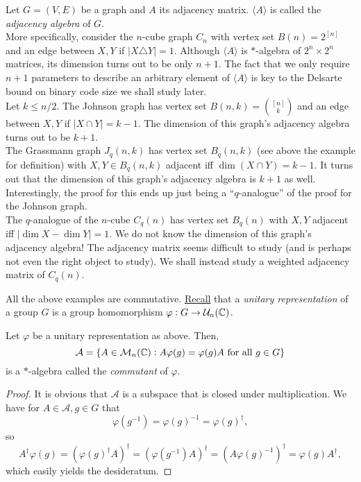 	\begin{fex}
		\label{exmp: star-alg}
		Let $G = (V,E)$ be a graph and $A$ its adjacency matrix. $\langle A\rangle$ is called the \emph{adjacency algebra} of $G$. \\

		More specifically, consider the $n$-cube graph $C_n$ with vertex set $B(n)=2^{[n]}$ and an edge between $X,Y$ if $|X \triangle Y| = 1$. Although $\langle A\rangle$ is $*$-algebra of $2^n \times 2^n$ matrices, its dimension turns out to be only $n+1$. The fact that we only require $n+1$ parameters to describe an arbitrary element of $\langle A\rangle$ is key to the Delsarte bound on binary code size we shall study later.\\

		Let $k \le n/2$. The Johnson graph has vertex set $B(n,k) = \binom{[n]}{k}$ and an edge between $X,Y$ if $|X \cap Y| = k-1$. The dimension of this graph's adjacency algebra turns out to be $k+1$.\\

		The Grassmann graph $J_q(n,k)$ has vertex set $B_q(n,k)$ (see above the example for definition) with $X,Y \in B_q(n,k)$ adjacent iff $\dim(X \cap Y) = k-1$. It turns out that the dimension of this graph's adjacency algebra is $k+1$ as well. Interestingly, the proof for this ends up just being a ``$q$-analogue'' of the proof for the Johnson graph.\\

		The $q$-analogue of the $n$-cube $C_q(n)$ has vertex set $B_q(n)$ with $X,Y$ adjacent iff $|\dim X - \dim Y| = 1$. We do not know the dimension of this graph's adjacency algebra! The adjacency matrix seems difficult to study (and is perhaps not even the right object to study). We shall instead study a weighted adjacency matrix of $C_q(n)$.
	\end{fex}

	All the above examples are commutative. \href{https://amitrajaraman.github.io/notes/rep-th/main.pdf}{Recall} that a \emph{unitary representation} of a group $G$ is a group homomorphism $\varphi : G \to \mathcal{U}_n(\mathbb{C})$.

	\begin{ftheo}
		Let $\varphi$ be a unitary representation as above. Then,
		\[ \mathcal{A} = \{A \in \mathcal{M}_n(\mathbb{C}) : A \varphi(g) = \varphi(g) A \text{ for all } g \in G \} \]
		is a $*$-algebra called the \emph{commutant} of $\varphi$.
	\end{ftheo}
	\begin{proof}
		It is obvious that $\mathcal{A}$ is a subspace that is closed under multiplication. We have for $A \in \mathcal{A}, g \in G$ that
		\[ \varphi(g^{-1}) = \varphi(g)^{-1} = \varphi(g)^\dagger, \]
		so
		\[ A^\dagger \varphi(g) = (\varphi(g)^\dagger A)^\dagger = (\varphi(g^{-1}) A)^\dagger = (A \varphi(g)^{-1})^\dagger = \varphi(g) A^\dagger, \]
		which easily yields the desideratum.
	\end{proof}

